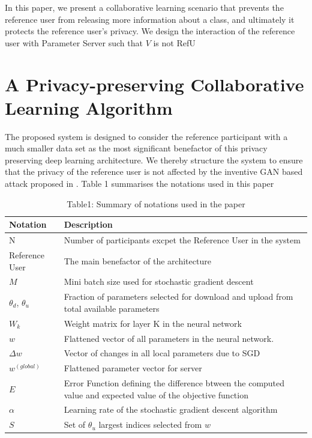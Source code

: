\documentclass[conference]{IEEEtran}
\begin{document}
In this paper, we present a collaborative learning scenario that prevents the reference user from releasing more
information about a class, and ultimately it protects the reference user's privacy. We design the interaction of the reference user
with Parameter Server such that $V$ is not RefU

\section{A Privacy-preserving Collaborative Learning Algorithm}

The proposed system is designed to consider the reference participant with a much smaller data set as the most significant benefactor
of this privacy preserving deep learning architecture. We thereby structure the system to ensure that the privacy of the reference
user is not affected by the inventive GAN based attack proposed in \cite{hitaj2017deep}. Table 1 summarises the notations used in this
paper


\begin{table}[!h]
\centering
\caption{Table1: Summary of notations used in the paper}
\label{table:1}
\begin{tabular}{ | m{} | m{}| } 
\hline
\textbf{Notation} & \textbf{Description} \\
 \hline\hline

N & Number of participants excpet the Reference User in the system\\
\hline
Reference User & The  main benefactor of the architecture \\
\hline
$M$ & Mini batch size used for stochastic gradient descent\\
\hline
$\theta_d$, $\theta_u$ & Fraction of parameters selected for download and upload from total available parameters \\
\hline
$W_k$ & Weight matrix for layer K in the neural network\\
\hline
$w$ & Flattened vector of all parameters in the neural network. \\
\hline
$\Delta w$ & Vector of changes in all local parameters due to SGD\\
\hline
$w^{(global)}$ & Flattened parameter vector for server\\
\hline
$E$ & Error Function defining the difference btween the computed value and expected value of the objective function \\
\hline
$\alpha$ & Learning rate of the stochastic gradient descent algorithm\\
\hline
$S$ & Set of $\theta_u$ largest indices selected from $w$ \\
\hline
\end{tabular}
\end{table}
\end{document}
